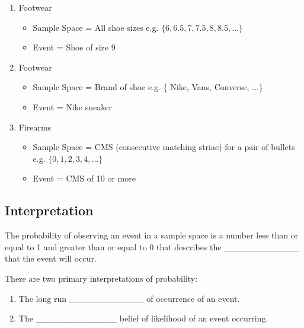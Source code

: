 \documentclass[]{book}
\providecommand{\tightlist}{%
  \setlength{\itemsep}{0pt}\setlength{\parskip}{0pt}}
\theoremstyle{definition}
\theoremstyle{definition}
\theoremstyle{remark}
\begin{document}
\begin{enumerate}
\def\labelenumi{\arabic{enumi}.}
\tightlist
\item
  Footwear

  \begin{itemize}
  \tightlist
  \item
    Sample Space = All shoe sizes e.g.
    \(\{6, 6.5, 7, 7.5, 8, 8.5, \dots\}\)
  \item
    Event = Shoe of size 9
  \end{itemize}
\item
  Footwear

  \begin{itemize}
  \tightlist
  \item
    Sample Space = Brand of shoe e.g. \{ Nike, Vans, Converse,
    \(\dots\)\}
  \item
    Event = Nike sneaker
  \end{itemize}
\item
  Firearms

  \begin{itemize}
  \tightlist
  \item
    Sample Space = CMS (consecutive matching striae) for a pair of
    bullets e.g. \(\{0, 1, 2, 3, 4, \dots \}\)
  \item
    Event = CMS of 10 or more
  \end{itemize}
\end{enumerate}

\subsection{Interpretation}\label{interpretation}

The probability of observing an event in a sample space is a number less
than or equal to 1 and greater than or equal to 0 that describes the
\_\_\_\_\_\_\_\_\_\_\_\_ that the event will occur.

There are two primary interpretations of probability: \vspace{.1in}

\begin{enumerate}
\def\labelenumi{\arabic{enumi}.}
\tightlist
\item
  The long run \_\_\_\_\_\_\_\_\_\_\_\_ of occurrence of an event.
  \vspace{.1in}
\item
  The \_\_\_\_\_\_\_\_\_\_\_\_\_ belief of likelihood of an event
  occurring.
\end{enumerate}
\end{document}
